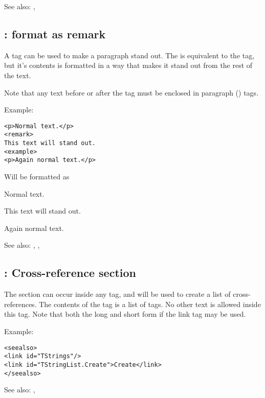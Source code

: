 See also: , 

\subsection{ : format as remark}
\label{tag:remark}
A  tag can be used to make a paragraph stand out. The
 is equivalent to the  tag, but it's contents is
formatted in a way that makes it stand out from the rest of the text.

Note that any text before or after the  tag must be enclosed in
paragraph () tags.

Example:
\begin{verbatim}
<p>Normal text.</p>
<remark>
This text will stand out.
<example>
<p>Again normal text.</p>
\end{verbatim}
Will be formatted as

Normal text.
\begin{remark}
This text will stand out.
\end{remark}
Again normal text.

See also: , , 

\subsection{ : Cross-reference section}
\label{tag:seealso}
The  section can occur inside any  tag, and will
be used to create a list of cross-references. The contents of the
 tag is a list of  tags. No other text is allowed
inside this tag. Note that both the long and short form if the link tag may
be used.

Example:
\begin{verbatim}
<seealso>
<link id="TStrings"/>
<link id="TStringList.Create">Create</link>
</seealso>
\end{verbatim}

See also: , 

